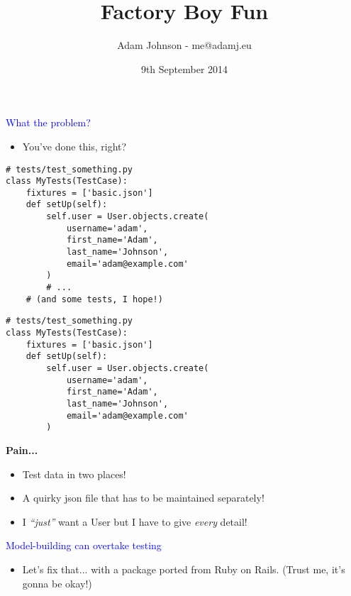 \documentclass[landscape]{slides}
\title{Factory Boy Fun}
\author{Adam Johnson - me@adamj.eu}
\date{9th September 2014}
\begin{document}
\maketitle

\begin{slide}

    \textcolor{blue}{\Large{What the problem?}}

    \begin{itemize}
        \item You've done this, right?
    \end{itemize}

    \begin{lstlisting}
# tests/test_something.py
class MyTests(TestCase):
    fixtures = ['basic.json']
    def setUp(self):
        self.user = User.objects.create(
            username='adam',
            first_name='Adam',
            last_name='Johnson',
            email='adam@example.com'
        )
        # ...
    # (and some tests, I hope!)
    \end{lstlisting}

\end{slide}


\begin{slide}
    \begin{lstlisting}
# tests/test_something.py
class MyTests(TestCase):
    fixtures = ['basic.json']
    def setUp(self):
        self.user = User.objects.create(
            username='adam',
            first_name='Adam',
            last_name='Johnson',
            email='adam@example.com'
        )
    \end{lstlisting}

    \textbf{Pain...}

    \begin{itemize}
        \item Test data in two places!
        \item A quirky json file that has to be maintained separately!
        \item I \emph{“just”} want a User but I have to give \emph{every} detail!
    \end{itemize}
\end{slide}


\begin{slide}
    \textcolor{blue}{\Large{Model-building can overtake testing}}

    \begin{itemize}
        \item Let's fix that... with a package ported from Ruby on Rails. (Trust me, it's gonna be okay!)
    \end{itemize}
\end{slide}
\end{document}

